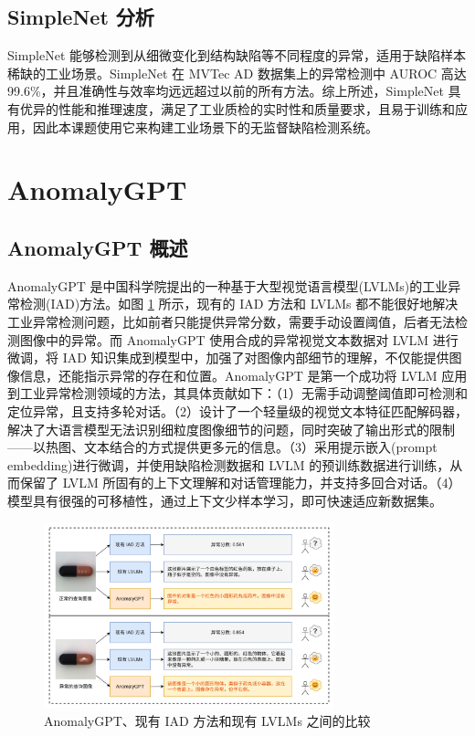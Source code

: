 \documentclass[
  ]{njuthesis}
\begin{document}
\subsection{SimpleNet 分析}

SimpleNet 能够检测到从细微变化到结构缺陷等不同程度的异常，适用于缺陷样本稀缺的工业场景。SimpleNet 在 MVTec AD 数据集上的异常检测中 AUROC 高达 99.6\%，并且准确性与效率均远远超过以前的所有方法。综上所述，SimpleNet 具有优异的性能和推理速度，满足了工业质检的实时性和质量要求，且易于训练和应用，因此本课题使用它来构建工业场景下的无监督缺陷检测系统。

\section{AnomalyGPT}

\subsection{AnomalyGPT 概述}

AnomalyGPT\cite{[14]} 是中国科学院提出的一种基于大型视觉语言模型(LVLMs)的工业异常检测(IAD)方法。如图 \ref{AnomalyGPT比较图} 所示，现有的 IAD 方法和 LVLMs 都不能很好地解决工业异常检测问题，比如前者只能提供异常分数，需要手动设置阈值，后者无法检测图像中的异常。而 AnomalyGPT 使用合成的异常视觉文本数据对 LVLM 进行微调，将 IAD 知识集成到模型中，加强了对图像内部细节的理解，不仅能提供图像信息，还能指示异常的存在和位置。AnomalyGPT 是第一个成功将 LVLM 应用到工业异常检测领域的方法，其具体贡献如下：（1）无需手动调整阈值即可检测和定位异常，且支持多轮对话。（2）设计了一个轻量级的视觉文本特征匹配解码器，解决了大语言模型无法识别细粒度图像细节的问题，同时突破了输出形式的限制——以热图、文本结合的方式提供更多元的信息。（3）采用提示嵌入(prompt embedding)进行微调，并使用缺陷检测数据和 LVLM 的预训练数据进行训练，从而保留了 LVLM 所固有的上下文理解和对话管理能力，并支持多回合对话。（4）模型具有很强的可移植性，通过上下文少样本学习，即可快速适应新数据集。

\begin{figure}[ht]
    \centering
    \includegraphics[width=0.75\textwidth]{images/AnomalyGPT演示.png}
    \caption{AnomalyGPT、现有 IAD 方法和现有 LVLMs 之间的比较}
    \label{AnomalyGPT比较图}
\end{figure}
\end{document}
